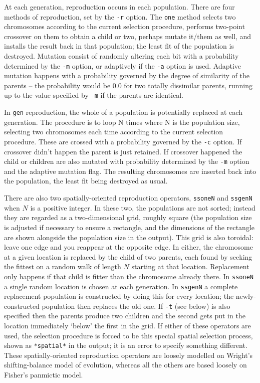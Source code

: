 At each generation, reproduction occurs in each population. There are
four methods of reproduction, set by the \verb|-r| option.  The
\verb|one| method selects two chromosomes according to the current
selection procedure, performs two-point crossover on them to obtain a
child or two, perhaps mutate it/them as well, and installs the result back
in that population; the least fit of the population is destroyed.
Mutation consist of randomly altering each bit with a probability
determined by the \verb|-m| option, or adaptively if the \verb|-a|
option is used. Adaptive mutation happens with a probability governed
by the degree of similarity of the parents -- the probability would be
0.0 for two totally dissimilar parents, running up to the value
specified by \verb|-m| if the parents are identical.

In \verb|gen| reproduction, the whole of a population is potentially
replaced at each generation. The procedure is to loop N times where N is
the population size, selecting two chromosomes each time according to
the current selection procedure. These are crossed with a probability
governed by the \verb|-c| option. If crossover didn't happen the parent
is just retained. If crossover happened the child or children are also
mutated with probability determined by the \verb|-m| option and the
adaptive mutation flag. The resulting chromosomes are inserted back into
the population, the least fit being destroyed as usual.

There are also two spatially-oriented reproduction operators,
\verb|ssoneN| and \verb|ssgenN| when $N$ is a positive integer. In these
two, the populations are not sorted; instead they are regarded as a
two-dimensional grid, roughly square (the population size is adjusted if
necessary to ensure a rectangle, and the dimensions of the rectangle are
shown alongside the population size in the output). This grid is also
toroidal: leave one edge and you reappear at the opposite edge. In
either, the chromosome at a given location is replaced by the child of
two parents, each found by seeking the fittest on a random walk of
length $N$ starting at that location. Replacement only happens if that
child is fitter than the chromosome already there. In \verb|ssoneN| a
single random location is chosen at each generation. In \verb|ssgenN| a
complete replacement population is constructed by doing this for every
location; the newly-constructed population then replaces the old one. If
\verb|-t| (see below) is also specified then the parents produce two children
and the second gets put in the location immediately `below' the first in
the grid. If either of these operators are used, the selection procedure
is forced to be this special spatial selection process, shown as
\verb|*spatial*| in the output; it is an error to specify something
different. These spatially-oriented reproduction operators are loosely
modelled on Wright's shifting-balance model of evolution, whereas all
the others are based loosely on Fisher's panmictic model.

